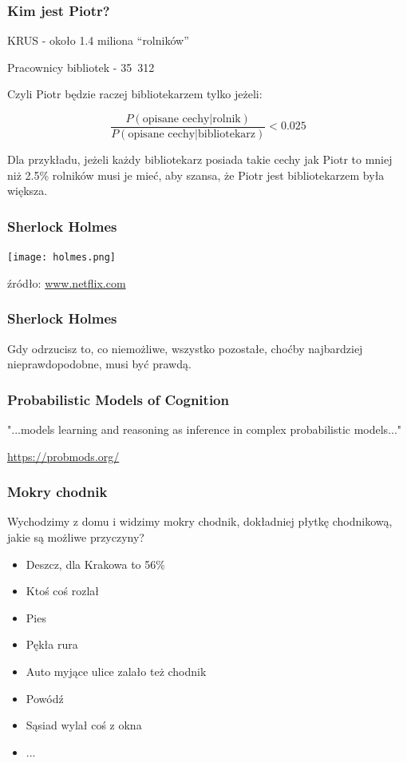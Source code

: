 \documentclass{beamer}
\begin{document}
\begin{frame}
	\frametitle{
	Kim jest Piotr?}

KRUS - około 1.4 miliona ``rolników''

Pracownicy bibliotek - 35~312

Czyli Piotr będzie raczej bibliotekarzem tylko jeżeli:

$$
\frac{P(\text{opisane cechy|rolnik})}{P(\text{opisane cechy|bibliotekarz})} < 0.025
$$

Dla przykładu, jeżeli każdy bibliotekarz posiada takie cechy jak Piotr to mniej niż 2.5\% rolników musi je mieć, aby szansa, że Piotr jest bibliotekarzem była większa.
\end{frame}



\begin{frame}
	\frametitle{
	Sherlock Holmes}
	\begin{center}
	\texttt{[image: holmes.png]}
	\end{center}

	źródło: \url{www.netflix.com}
\end{frame}

\begin{frame}
	\frametitle{
	Sherlock Holmes}
	
	Gdy odrzucisz to, co niemożliwe, wszystko pozostałe, choćby najbardziej nieprawdopodobne, musi być prawdą. 
\end{frame}

\begin{frame}
	\frametitle{Probabilistic Models of Cognition}
	"...models learning and reasoning as inference in complex probabilistic models..."
	
	
	\url{https://probmods.org/}
\end{frame}

\begin{frame}
	\frametitle{
	Mokry chodnik}
	
	Wychodzimy z domu i widzimy mokry chodnik, dokładniej płytkę chodnikową, jakie są możliwe przyczyny?
	
	\begin{itemize}[<+->]
		\item Deszcz, dla Krakowa to 56\%
		\item Ktoś coś rozlał
		\item Pies
		\item Pękła rura
		\item Auto myjące ulice zalało też chodnik
		\item Powódź
		\item Sąsiad wylał coś z okna
		\item ...
	\end{itemize}

\end{frame}
\end{document}
